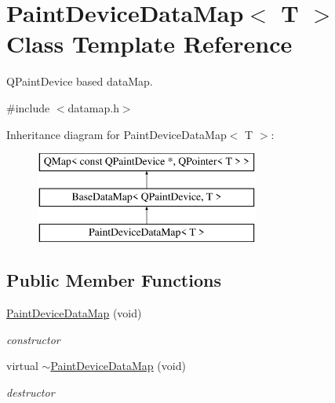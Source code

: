 \hypertarget{class_paint_device_data_map}{}\section{Paint\+Device\+Data\+Map$<$ T $>$ Class Template Reference}
\label{class_paint_device_data_map}


Q\+Paint\+Device based data\+Map.  




{\ttfamily \#include $<$datamap.\+h$>$}

Inheritance diagram for Paint\+Device\+Data\+Map$<$ T $>$\+:\begin{figure}[H]
\begin{center}
\leavevmode
\includegraphics[height=3.000000cm]{class_paint_device_data_map}
\end{center}
\end{figure}
\subsection*{Public Member Functions}
\begin{DoxyCompactItemize}
\item 
\mbox{\label{class_paint_device_data_map_a9a8a3d21a80b739e502f11446dc5691a}} 
\hyperlink{class_paint_device_data_map_a9a8a3d21a80b739e502f11446dc5691a}{Paint\+Device\+Data\+Map} (void)
\begin{DoxyCompactList}\small\item\em constructor \end{DoxyCompactList}\item 
\mbox{\label{class_paint_device_data_map_a1a87015504f77eb89709fae2805439b5}} 
virtual \hyperlink{class_paint_device_data_map_a1a87015504f77eb89709fae2805439b5}{$\sim$\+Paint\+Device\+Data\+Map} (void)
\begin{DoxyCompactList}\small\item\em destructor \end{DoxyCompactList}\end{DoxyCompactItemize}
